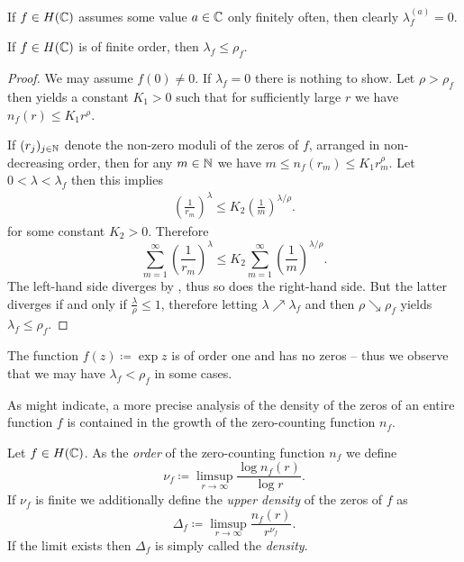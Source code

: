 If $f \in H(\mathbb{C})$ assumes some value $a \in \mathbb{C}$ only finitely often, then clearly $\lambda_f^{(a)} = 0$.

\begin{theorem} \label{thm:inequality-order-exponent-of-convergence}
    If $f \in H(\mathbb{C})$ is of finite order, then $\lambda_f \leq \rho_f$.
\end{theorem}

\begin{proof}
    We may assume $f(0) \neq 0$. If $\lambda_f = 0$ there is nothing to show. Let $\rho > \rho_f$ then  yields a constant $K_1 > 0$ such that for sufficiently large $r$ we have $n_f(r) \leq K_1 r^{\rho}$.
    
    If $(r_j)_{j \in \mathbb{N}}$ denote the non-zero moduli of the zeros of $f$, arranged in non-decreasing order, then for any $m \in \mathbb{N}$ we have $m \leq n_f(r_m) \leq K_1 r_m^{\rho}$. Let $0 < \lambda < \lambda_f$ then this implies
    \begin{align*}
        \left( \frac{1}{r_m} \right)^{\lambda} \leq K_2 \left( \frac{1}{m} \right)^{\lambda/\rho}.
    \end{align*}
    for some constant $K_2 > 0$. Therefore
    \begin{equation*}
        \sum_{m=1}^\infty \left( \frac{1}{r_m} \right)^{\lambda} \leq K_2 \sum_{m=1}^\infty \left( \frac{1}{m} \right)^{\lambda/\rho}.
    \end{equation*}
    The left-hand side diverges by , thus so does the right-hand side. But the latter diverges if and only if $\frac{\lambda}{\rho} \leq 1$, therefore letting $\lambda \nearrow \lambda_f$ and then $\rho \searrow \rho_f$ yields $\lambda_f \leq \rho_f$.
\end{proof}

\begin{remark}
    The function $f(z) \coloneqq \exp z$ is of order one and has no zeros -- thus we observe that we may have $\lambda_f < \rho_f$ in some cases.
\end{remark}

As  might indicate, a more precise analysis of the density of the zeros of an entire function $f$ is contained in the growth of the zero-counting function $n_f$.

\begin{definition} \label{def:order-density-zero-counting}
    Let $f \in H(\mathbb{C})$. As the \emph{order} of the zero-counting function $n_f$ we define
    \begin{equation}
        \nu_f \coloneqq \limsup_{r \to \infty} \frac{\log n_f(r)}{\log r}.
    \end{equation}
    If $\nu_f$ is finite we additionally define the \emph{upper density} of the zeros of $f$ as
    \begin{equation}
        \Delta_f \coloneqq \limsup_{r \to \infty} \frac{n_f(r)}{r^{\nu_f}}.
    \end{equation}
    If the limit exists then $\Delta_f$ is simply called the \emph{density}.
\end{definition}

